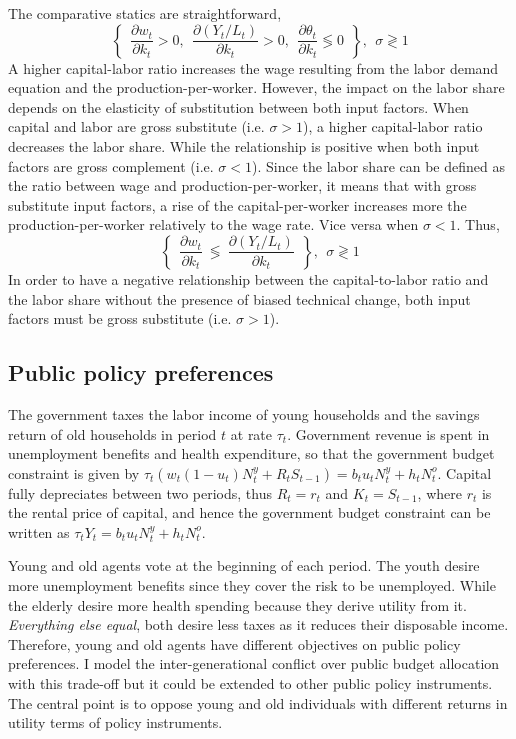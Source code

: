 The comparative statics are straightforward,
	\begin{equation*}
		\left\lbrace ~~
		\frac{\partial w_t}{\partial k_t} > 0,~~
		\frac{\partial (Y_t/L_t)}{\partial k_t} > 0,~~
		\frac{\partial \theta_t}{\partial k_t} \lessgtr 0 ~~
		\right\rbrace, ~~ \sigma \gtrless 1
	\end{equation*}
A higher capital-labor ratio increases the wage resulting from the labor demand equation and the production-per-worker. However, the impact on the labor share depends on the elasticity of substitution between both input factors. When capital and labor are gross substitute (i.e. $\sigma > 1$), a higher capital-labor ratio decreases the labor share. While the relationship is positive when both input factors are gross complement (i.e. $\sigma < 1$). Since the labor share can be defined as the ratio between wage and production-per-worker, it means that with gross substitute input factors, a rise of the capital-per-worker increases more the production-per-worker relatively to the wage rate. Vice versa when $\sigma <1$. Thus,
	\begin{equation*}
		\left\lbrace ~~
		\frac{\partial w_t}{\partial k_t} ~\lessgtr~ \frac{\partial (Y_t/L_t)}{\partial k_t} ~~
		\right\rbrace, ~~ \sigma \gtrless 1
	\end{equation*}
In order to have a negative relationship between the capital-to-labor ratio and the labor share without the presence of biased technical change, both input factors must be gross substitute (i.e. $\sigma >1$).

\subsection{Public policy preferences}\label{subsec:public_policy_preferences}

The government taxes the labor income of young households and the savings return of old households in period $t$ at rate $\tau_t$. Government revenue is spent in unemployment benefits and health expenditure, so that the government budget constraint is given by $\tau_t\left( w_t(1-u_t)N^y_t + R_t S_{t-1} \right) = b_t u_t N^y_t + h_t N^o_t$. Capital fully depreciates between two periods, thus  $R_t = r_t$ and $K_t = S_{t-1}$, where $r_t$ is the rental price of capital, and hence the government budget constraint can be written as $\tau_t Y_t = b_t u_t N^y_t + h_t N^o_t$.

Young and old agents vote at the beginning of each period. The youth desire more unemployment benefits since they cover the risk to be unemployed. While the elderly desire more health spending because they derive utility from it. \textit{Everything else equal}, both desire less taxes as it reduces their disposable income. Therefore, young and old agents have different objectives on public policy preferences. I model the inter-generational conflict over public budget allocation with this trade-off but it could be extended to other public policy instruments. The central point is to oppose young and old individuals with different returns in utility terms of policy instruments.

